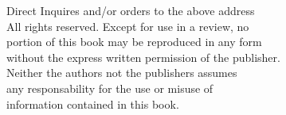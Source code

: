 \documentclass[
11pt, %
spanish,
singlespacing, %
parskip, %
headsepline, %
]{MastersDoctoralThesis} %
\begin{document}
\begin{flushleft}
\begin{small}
Direct Inquires and/or orders to the above address\\
\vspace{5mm} 
All rights reserved. Except for use in a review, no\\
portion of this book may be reproduced in any form\\
without the express written permission of the publisher.\\
\vspace{5mm} 
Neither the authors not the publishers assumes\\
any responsability for the use or misuse of\\
information contained in this book.\\


\end{small}
\end{flushleft} 
\end{document}
